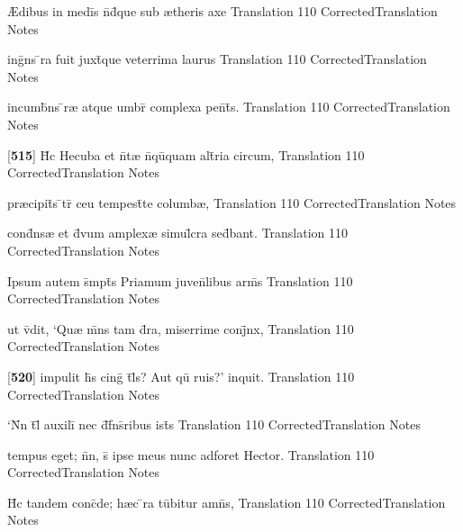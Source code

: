 \latline
  {{\AE}dibus in medi\={\macron {\i}}s n\={}d\={}que sub {\ae}theris axe}
  { Translation }
  {110}
  { CorrectedTranslation }
  { Notes }


\latline
  {ing\={}ns \={}ra fuit juxt\={}que veterrima laurus}
  { Translation }
  {110}
  { CorrectedTranslation }
  { Notes }


\latline
  {incumb\={}ns \={}r{\ae} atque umbr\={} complexa pen\={}t\={\macron {\i}}s.}
  { Translation }
  {110}
  { CorrectedTranslation }
  { Notes }


\latline
  {[\textbf{515}] H\={\macron {\i}}c Hecuba et n\={}t{\ae} n\={}qu\={\macron {\i}}quam alt\={}ria circum,}
  { Translation }
  {110}
  { CorrectedTranslation }
  { Notes }


\latline
  {pr{\ae}cipit\={}s \={}tr\={} ceu tempest\={}te columb{\ae},}
  { Translation }
  {110}
  { CorrectedTranslation }
  { Notes }


\latline
  {cond\={}ns{\ae} et d\={\macron {\i}}vum amplex{\ae} simul\={}cra sed\={}bant.}
  { Translation }
  {110}
  { CorrectedTranslation }
  { Notes }


\latline
  {Ipsum autem s\={}mpt\={\macron {\i}}s Priamum juven\={}libus arm\={\macron {\i}}s}
  { Translation }
  {110}
  { CorrectedTranslation }
  { Notes }


\latline
  {ut v\={\macron {\i}}dit, `Qu{\ae} m\={}ns tam d\={\macron {\i}}ra, miserrime conj\={}nx,}
  { Translation }
  {110}
  { CorrectedTranslation }
  { Notes }


\latline
  {[\textbf{520}] impulit h\={\macron {\i}}s cing\={\macron {\i}} t\={}l\={\macron {\i}}s?  Aut qu\={} ruis?' inquit.}
  { Translation }
  {110}
  { CorrectedTranslation }
  { Notes }


\latline
  {`N\={}n t\={}l\={\macron {\i}} auxili\={} nec d\={}f\={}ns\={}ribus ist\={\macron {\i}}s}
  { Translation }
  {110}
  { CorrectedTranslation }
  { Notes }


\latline
  {tempus eget; n\={}n, s\={\macron {\i}} ipse meus nunc adforet Hector.}
  { Translation }
  {110}
  { CorrectedTranslation }
  { Notes }


\latline
  {H\={}c tandem conc\={}de; h{\ae}c \={}ra tu\={}bitur amn\={\macron {\i}}s,}
  { Translation }
  {110}
  { CorrectedTranslation }
  { Notes }


